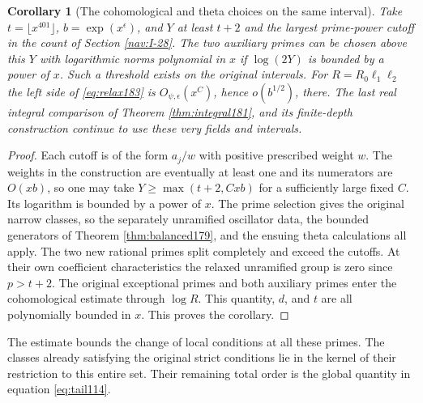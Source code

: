 \documentclass[a4paper,11pt]{article}
\newtheorem{corollary}[proposition]{Corollary}
\theoremstyle{definition}
\theoremstyle{remark}
\numberwithin{equation}{section}
\begin{document}
\begin{corollary}[The cohomological and theta choices on the same interval]
\leavevmode\label{cor:both183}
Take \(t=\lfloor x^{401}\rfloor\), \(b=\exp(x^\epsilon)\),
and \(Y\) at least \(t+2\) and the largest prime-power cutoff
in the count of Section \ref{nav:I-28}. The two auxiliary
primes can be chosen above this \(Y\) with logarithmic norms
polynomial in \(x\) if \(\log(2Y)\) is bounded by a power of
\(x\). Such a threshold exists on the original intervals.
For \(R=R_0\ell_1\ell_2\) the left side of \eqref{eq:relax183}
is \(O_{\psi,\epsilon}(x^C)\), hence
\(o(b^{1/2})\), there. The last real integral comparison of
Theorem \ref{thm:integral181}, and its finite-depth construction
continue to use these very fields and intervals.
\end{corollary}
\begin{proof}
Each cutoff is of the form \(a_j/w\) with positive prescribed
weight \(w\). The weights in the construction are eventually
at least one and its numerators are \(O(xb)\), so one may
take \(Y\ge\max(t+2,Cxb)\) for a sufficiently large fixed
\(C\). Its logarithm is bounded by a power of \(x\). The
prime selection gives the original narrow classes, so the
separately unramified oscillator data, the bounded generators
of Theorem \ref{thm:balanced179}, and the ensuing theta calculations
all apply. The two new rational primes split completely and
exceed the cutoffs. At their own coefficient characteristics
the relaxed unramified group is zero since \(p>t+2\).
The original exceptional primes and both auxiliary primes
enter the cohomological estimate through \(\log R\). This
quantity, \(d\), and \(t\) are all polynomially bounded in \(x\). This proves the corollary.
\end{proof}

The estimate bounds the change of local conditions at all
these primes. The classes already satisfying the original
strict conditions lie in the kernel of their restriction
to this entire set. Their remaining total order is the
global quantity in equation \ref{eq:tail114}.
\end{document}
